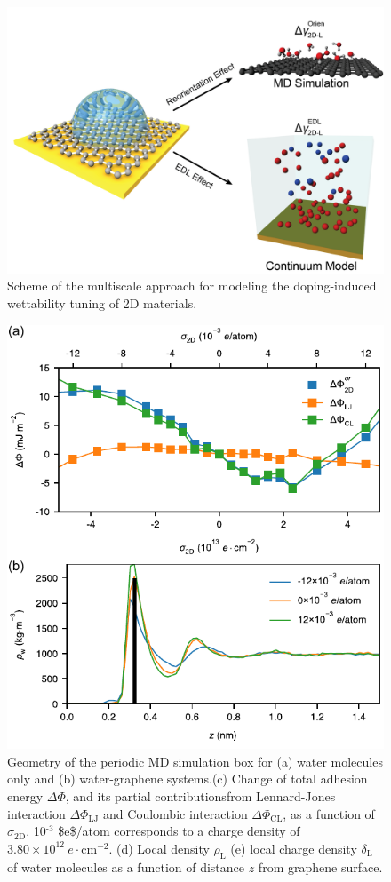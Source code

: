 \documentclass[journal=jacsat,manuscript=article,email=true]{achemso}
\begin{document}
\begin{figure}[htbp]
\centering
\includegraphics[width=0.95\linewidth]{../img/scheme-methods.png}
\caption{\label{fig:scheme-method}
Scheme of the multiscale approach for modeling the doping-induced wettability tuning of 2D materials.}
\end{figure}

\begin{figure}[htbp]
\centering
\includegraphics[width=0.9\linewidth]{../img/fig-pot-dens.pdf}
\caption{\label{fig:MD-res}
Geometry of the periodic MD simulation box for (a) water molecules only and (b) water-graphene systems.(c) Change of total adhesion energy \(\Delta\Phi\), and its partial contributionsfrom Lennard-Jones interaction \(\Delta\Phi_{\mathrm{LJ}}\) and Coulombic interaction \(\Delta\Phi_{\mathrm{CL}}\), as a function of \(\sigma_{\mathrm{2D}}\). 10\(^{\text{-3}}\) \$e\$/atom corresponds to a charge density of \(3.80 \times 10^{12}\ e \cdot \mathrm{cm}^{-2}\). (d) Local density \(\rho_{\mathrm{L}}\) (e) local charge density \(\delta_{\mathrm{L}}\) of water molecules as a function of distance \(z\) from graphene surface.}
\end{figure}
\end{document}
